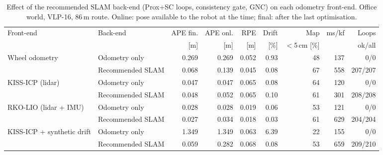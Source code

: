 \begin{table}[t]
\centering
\caption{Effect of the recommended SLAM back-end (Prox+SC loops, consistency gate, GNC) on each odometry front-end. Office world, VLP-16, 86\,m route. Online: pose available to the robot at the time; final: after the last optimisation.}
\label{tab:slam_summary}
\setlength{\tabcolsep}{3pt}
\begin{tabular}{llrrrrrrr}
\toprule
Front-end & Back-end & APE fin. & APE onl. & RPE & Drift & Map & ms/kf & Loops \\
 & & [m] & [m] & [m] & [\%] & $<$5\,cm [\%] & & ok/all \\
\midrule
\multirow{2}{*}{Wheel odometry} & Odometry only & 0.269 & 0.269 & 0.052 & 0.93 & 48 & 137 & 0/0 \\
 & Recommended SLAM & 0.068 & 0.139 & 0.045 & 0.08 & 67 & 558 & 207/207 \\
\midrule
\multirow{2}{*}{KISS-ICP (lidar)} & Odometry only & 0.047 & 0.047 & 0.065 & 0.08 & 64 & 120 & 0/0 \\
 & Recommended SLAM & 0.048 & 0.052 & 0.065 & 0.10 & 61 & 301 & 208/208 \\
\midrule
\multirow{2}{*}{RKO-LIO (lidar + IMU)} & Odometry only & 0.028 & 0.028 & 0.019 & 0.06 & 53 & 121 & 0/0 \\
 & Recommended SLAM & 0.027 & 0.034 & 0.018 & 0.03 & 61 & 629 & 204/204 \\
\midrule
\multirow{2}{*}{KISS-ICP + synthetic drift} & Odometry only & 1.349 & 1.349 & 0.063 & 6.39 & 22 & 155 & 0/0 \\
 & Recommended SLAM & 0.059 & 0.282 & 0.068 & 0.08 & 53 & 659 & 209/210 \\
\bottomrule
\end{tabular}
\end{table}
